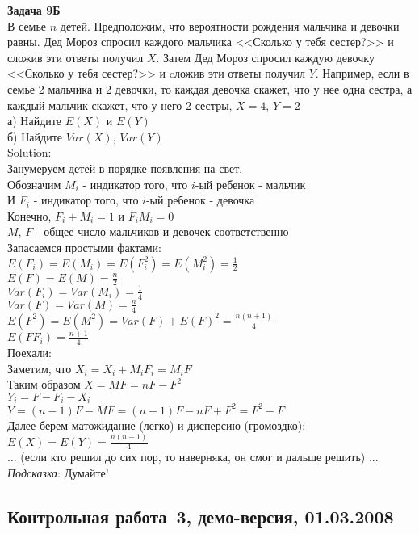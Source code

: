 \documentclass[pdftex,12pt,a4paper]{article}
\begin{document}
\textbf{Задача 9Б} \\
В семье $n$ детей. Предположим, что вероятности рождения мальчика и девочки равны. Дед Мороз спросил каждого мальчика <<Сколько у тебя сестер?>> и сложив эти ответы получил $X$. Затем Дед Мороз спросил каждую девочку <<Сколько у тебя сестер?>> и cложив эти ответы получил $Y$. Например, если в семье 2 мальчика и 2 девочки, то каждая девочка скажет, что у нее одна сестра, а каждый мальчик скажет, что у него 2 сестры, $X=4$, $Y=2$ \\
а) Найдите $E(X)$ и $E(Y)$ \\
б) Найдите $Var(X)$, $Var(Y)$ \\
Solution: \\
Занумеруем детей в порядке появления на свет. \\
Обозначим $M_{i}$ - индикатор того, что $i$-ый ребенок - мальчик \\
И $F_{i}$ - индикатор того, что $i$-ый ребенок - девочка \\
Конечно, $F_{i}+M_{i}=1$ и $F_{i}M_{i}=0$ \\
$M$, $F$ - общее число мальчиков и девочек соответственно \\
Запасаемся простыми фактами: \\
$E(F_{i})=E(M_{i})=E(F_{i}^{2})=E(M_{i}^{2})=\frac{1}{2}$ \\
$E(F)=E(M)=\frac{n}{2}$ \\
$Var(F_{i})=Var(M_{i})=\frac{1}{4}$ \\
$Var(F)=Var(M)=\frac{n}{4}$ \\
$E(F^{2})=E(M^{2})=Var(F)+E(F)^{2}=\frac{n(n+1)}{4}$ \\
$E(FF_{i})=\frac{n+1}{4}$ \\
Поехали: \\
Заметим, что $X_{i}=X_{i}+M_{i}F_{i}=M_{i}F$ \\
Таким образом $X=MF=nF-F^{2}$ \\
$Y_{i}=F-F_{i}-X_{i}$ \\
$Y=(n-1)F-MF=(n-1)F-nF+F^{2}=F^{2}-F$ \\
Далее берем матожидание (легко) и дисперсию (громоздко): \\
$E(X)=E(Y)=\frac{n(n-1)}{4}$ \\
... (если кто решил до сих пор, то наверняка, он смог и дальше решить) ...\\


\emph{Подсказка}: Думайте! \\


\subsection{Контрольная работа \No\,3, демо-версия, 01.03.2008}
\end{document}
